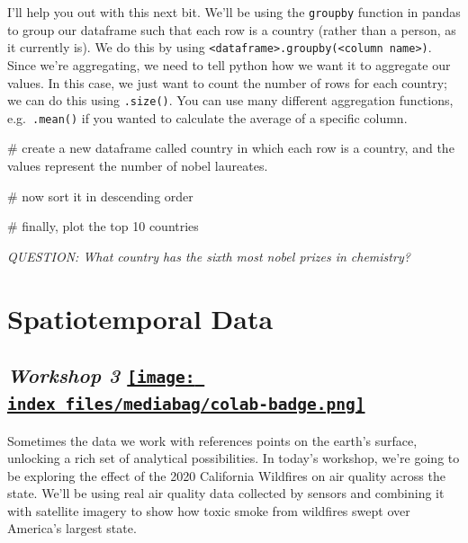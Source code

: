 \documentclass[
  letterpaper,
  DIV=11,
  numbers=noendperiod]{scrreprt}
\newenvironment{Shaded}{\begin{snugshade}}{\end{snugshade}}
\newcommand{\CommentTok}[1]{\textcolor[rgb]{0.37,0.37,0.37}{#1}}
\begin{document}
I'll help you out with this next bit. We'll be using the
\texttt{groupby} function in pandas to group our dataframe such that
each row is a country (rather than a person, as it currently is). We do
this by using
\texttt{\textless{}dataframe\textgreater{}.groupby(\textquotesingle{}\textless{}column\ name\textgreater{}\textquotesingle{})}.
Since we're aggregating, we need to tell python how we want it to
aggregate our values. In this case, we just want to count the number of
rows for each country; we can do this using \texttt{.size()}. You can
use many different aggregation functions, e.g.~\texttt{.mean()} if you
wanted to calculate the average of a specific column.

\begin{Shaded}
\begin{Highlighting}[]
\CommentTok{\# create a new dataframe called \textquotesingle{}country\textquotesingle{} in which each row is a country, and the values represent the number of nobel laureates. }

\CommentTok{\# now sort it in descending order}

\CommentTok{\# finally, plot the top 10 countries }
\end{Highlighting}
\end{Shaded}

\emph{QUESTION: What country has the sixth most nobel prizes in
chemistry?}


\hypertarget{spatiotemporal-data}{%
\chapter{Spatiotemporal Data}\label{spatiotemporal-data}}

\hypertarget{workshop-3-open-in-colab}{%
\section[\emph{Workshop 3} ]{\texorpdfstring{\emph{Workshop 3}
\href{https://colab.research.google.com/github/oballinger/QM2/blob/main/notebooks/W03.\%20Spatial\%20Data.ipynb}{\protect\texttt{[image: index\_files/mediabag/colab-badge.png]}}}{Workshop 3 Open In Colab}}\label{workshop-3-open-in-colab}}

Sometimes the data we work with references points on the earth's
surface, unlocking a rich set of analytical possibilities. In today's
workshop, we're going to be exploring the effect of the 2020 California
Wildfires on air quality across the state. We'll be using real air
quality data collected by sensors and combining it with satellite
imagery to show how toxic smoke from wildfires swept over America's
largest state.
\end{document}

